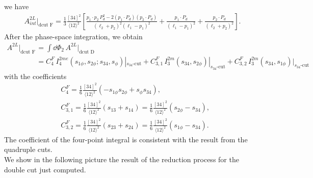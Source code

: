 we have
\begin{align*}
	A^{2L}_{int}|_{\text{dcut F}}=\frac{1}{3}\frac{[34]^2}{\langle 12 \rangle^2} \left[\frac{p_1\cdot p_2\, P_d^2-2(p_1\cdot P_d)(p_2\cdot P_d)}{(\ell_2+p_2)^2(\ell_1-p_1)^2}+\frac{p_1\cdot P_d}{(\ell_1-p_1)^2}+\frac{p_2\cdot P_d}{(\ell_2+p_2)^2}\right].
\end{align*}
After the phase-space integration, we obtain
\begin{align*}
	A^{2L}|_{\text{dcut F}}&=\int \dd\Phi_2\, A^{2L}|_{\text{dcut D}}\\&=C_4^F\,I_4^{2me}(s_{1\phi},s_{2\phi};s_{34},s_\phi)|_{s_{34}\text{-cut}}+C_{3,1}^F\,I_3^{2m}(s_{34},s_{2\phi})|_{s_{34}\text{-cut}}
	+C_{3,2}^F\,I_3^{2m}(s_{34},s_{1\phi})|_{s_{34}\text{-cut}}
\end{align*}
with the coefficients
\begin{align*}
	&C_4^F=\frac{1}{6}\frac{[34]^2}{\langle 12 \rangle^2}(-s_{1\phi}s_{2\phi}+s_\phi s_{34}),\\
	&C_{3,1}^F=\frac{1}{6}\frac{[34]^2}{\langle 12 \rangle^2}(s_{13}+s_{14})=\frac{1}{6}\frac{[34]^2}{\langle 12 \rangle^2}(s_{2\phi}-s_{34}),\\
	&C_{3,2}^F=\frac{1}{6}\frac{[34]^2}{\langle 12 \rangle^2}(s_{23}+s_{24})=\frac{1}{6}\frac{[34]^2}{\langle 12 \rangle^2}(s_{1\phi}-s_{34}).
\end{align*}
The coefficient of the four-point integral is consistent with the result from the quadruple cuts.\\
We show in the following picture the result of the reduction process for the double cut just computed.
